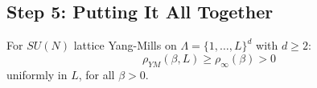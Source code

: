 \subsection{Step 5: Putting It All Together}

\begin{theorem}
\label{thm:uniform-lsi-ym}
For $SU(N)$ lattice Yang-Mills on $\Lambda = \{1, \ldots, L\}^d$ with $d \geq 2$:
\begin{equation}
\rho_{YM}(\beta, L) \geq \rho_\infty(\beta) > 0
\end{equation}
uniformly in $L$, for all $\beta > 0$.
\end{theorem}

